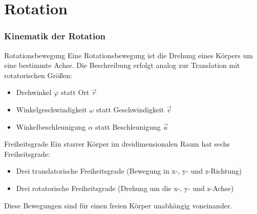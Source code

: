 \section{Rotation}

\subsubsection{Kinematik der Rotation}

\begin{definition}{Rotationsbewegung}
    Eine Rotationsbewegung ist die Drehung eines Körpers um eine bestimmte Achse. Die Beschreibung erfolgt analog zur Translation mit rotatorischen Größen:
    \begin{itemize}
        \item Drehwinkel $\varphi$ statt Ort $\vec{r}$
        \item Winkelgeschwindigkeit $\omega$ statt Geschwindigkeit $\vec{v}$
        \item Winkelbeschleunigung $\alpha$ statt Beschleunigung $\vec{a}$
    \end{itemize}
\end{definition}

\begin{concept}{Freiheitsgrade}
    Ein starrer Körper im dreidimensionalen Raum hat sechs Freiheitsgrade:
    \begin{itemize}
        \item Drei translatorische Freiheitsgrade (Bewegung in x-, y- und z-Richtung)
        \item Drei rotatorische Freiheitsgrade (Drehung um die x-, y- und z-Achse)
    \end{itemize}
    Diese Bewegungen sind für einen freien Körper unabhängig voneinander.
\end{concept}

